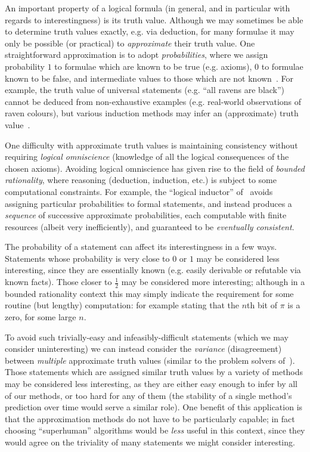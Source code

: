 An important property of a logical formula (in general, and in particular with
regards to interestingness) is its truth value. Although we may sometimes be
able to determine truth values exactly, e.g. via deduction, for many formulae it
may only be possible (or practical) to \emph{approximate} their truth value. One
straightforward approximation is to adopt \emph{probabilities}, where we assign
probability $1$ to formulae which are known to be true (e.g. axioms), $0$ to
formulae known to be false, and intermediate values to those which are not
known~\cite{Hutter.Lloyd.Ng.ea:2013}. For example, the truth value of universal
statements (e.g. ``all ravens are black'') cannot be deduced from non-exhaustive
examples (e.g. real-world observations of raven colours), but various induction
methods may infer an (approximate) truth value~\cite{10.1093/mind/LIV.214.97}.

One difficulty with approximate truth values is maintaining consistency without
requiring \emph{logical omniscience} (knowledge of all the logical consequences
of the chosen axioms). Avoiding logical omniscience has given rise to the field
of \emph{bounded rationality}, where reasoning (deduction, induction, etc.) is
subject to some computational constraints. For example, the ``logical inductor''
of~\cite{garrabrant2016logical} avoids assigning particular probabilities to
formal statements, and instead produces a \emph{sequence} of successive
approximate probabilities, each computable with finite resources (albeit very
inefficiently), and guaranteed to be \emph{eventually consistent}.

The probability of a statement can affect its interestingness in a few ways.
Statements whose probability is very close to $0$ or $1$ may be considered
less interesting, since they are essentially known (e.g. easily derivable or
refutable via known facts). Those closer to $\frac{1}{2}$ may be considered more
interesting; although in a bounded rationality context this may simply indicate
the requirement for some routine (but lengthy) computation: for example stating
that the $n$th bit of $\pi$ is a zero, for some large $n$.

To avoid such trivially-easy and infeasibly-difficult statements (which we may
consider uninteresting) we can instead consider the \emph{variance}
(disagreement) between \emph{multiple} approximate truth values (similar to the
problem solvers of~\cite{fernando2013design1, fernando2013design2}). Those
statements which are assigned similar truth values by a variety of methods may
be considered less interesting, as they are either easy enough to infer by all
of our methods, or too hard for any of them (the stability of a single method's
prediction over time would serve a similar role). One benefit of this
application is that the approximation methods do not have to be particularly
capable; in fact choosing ``superhuman'' algorithms would be \emph{less} useful
in this context, since they would agree on the triviality of many statements we
might consider interesting.

